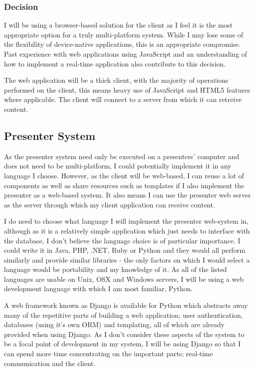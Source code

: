 \documentclass[a4papert,11pt,notitlepage]{ltxdoc}
\begin{document}
\subsubsection{Decision}
I will be using a browser-based solution for the client as I feel it is the most appropriate option for a truly multi-platform system. While I may lose some of the flexibility of device-native applications, this is an appropriate compromise. Past experience with web applications using JavaScript and an understanding of how to implement a real-time application also contribute to this decision.

The web application will be a thick client, with the majority of operations performed on the client, this means heavy use of JavaScript and HTML5 features where applicable. The client will connect to a server from which it can retreive content.

\subsection{Presenter System}
As the presenter system need only be executed on a presenters' computer and does not need to be multi-platform, I could potentially implement it in any language I choose. However, as the client will be web-based, I can reuse a lot of components as well as share resources such as templates if I also implement the presenter as a web-based system. It also means I can use the presenter web server as the server through which my client application can receive content.

I do need to choose what language I will implement the presenter web-system in, although as it is a relatively simple application which just needs to interface with the database, I don't believe the language choice is of particular importance. I could write it in Java, PHP, .NET, Ruby or Python and they would all perform similarly and provide similar libraries - the only factors on which I would select a language would be portability and my knowledge of it. As all of the listed languages are usable on Unix, OSX and Windows servers, I will be using a web development language with which I am most familiar, Python.

A web framework known as Django\cite{django:web} is available for Python which abstracts away many of the repetitive parts of building a web application; user authentication, databases (using it's own ORM) and templating, all of which are already provided when using Django. As I don't consider these aspects of the system to be a focal point of development in my system, I will be using Django so that I can spend more time concentrating on the important parts; real-time communication and the client.
\end{document}
